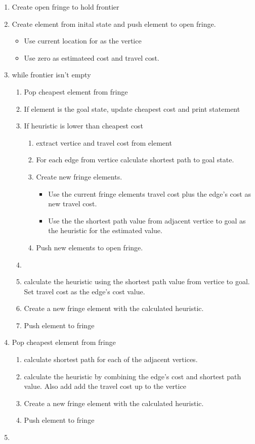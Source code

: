 \begin{enumerate}
\item Create open fringe to hold frontier
\item Create element from inital state and push element to open fringe.
\begin{itemize}
\item Use current location for as the vertice
\item Use zero as estimateed cost and travel cost.
\end{itemize}

\item while frontier isn't empty
\begin{enumerate}
	\item Pop cheapest element from fringe
	\item If element is the goal state, update cheapest cost and print statement
	\item If heuristic is lower than cheapest cost
	\begin{enumerate}
	\item extract vertice and travel cost from element
	\item For each edge from vertice calculate shortest path to goal state.
	\item Create new fringe elements.
	\begin{itemize}
	\item Use the current fringe elements travel cost plus the edge's cost as new 
		travel cost.
	\item Use the the shortest path value from adjacent vertice to goal as the 
		heuristic for the estimated value.
	\end{itemize}
	\item Push new elements to open fringe.
	\end{enumerate}
	\item 
	\item calculate the heuristic using the shortest path value from vertice to
		goal. Set travel cost as the edge's cost value.
	\item Create a new fringe element with the calculated heuristic.
	\item Push element to fringe
\end{enumerate}
\item Pop cheapest element from fringe
\begin{enumerate}
	\item calculate shortest path for each of the adjacent vertices.
	\item calculate the heuristic by combining the edge's cost and shortest path
		value. Also add add the travel cost up to the vertice
	\item Create a new fringe element with the calculated heuristic.
	\item Push element to fringe
\end{enumerate}
\item 
\end{enumerate}


